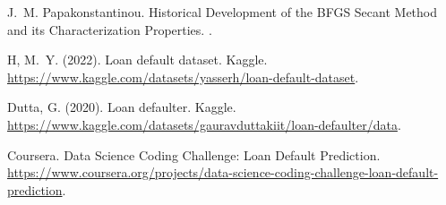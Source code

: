 \documentclass[12pt]{extarticle}
\numberwithin{equation}{section}
\begin{document}
\begin{thebibliography}{99}
J.~M. Papakonstantinou.
\newblock Historical Development of the BFGS Secant Method and its Characterization Properties.
.

\newblock H, M.~Y. (2022). Loan default dataset. Kaggle. 
\newblock \url{https://www.kaggle.com/datasets/yasserh/loan-default-dataset}.

\newblock Dutta, G. (2020). Loan defaulter. Kaggle. 
\newblock \url{https://www.kaggle.com/datasets/gauravduttakiit/loan-defaulter/data}.

\newblock Coursera. Data Science Coding Challenge: Loan Default Prediction. 
\newblock \url{https://www.coursera.org/projects/data-science-coding-challenge-loan-default-prediction}.

\end{thebibliography}
\end{document}
